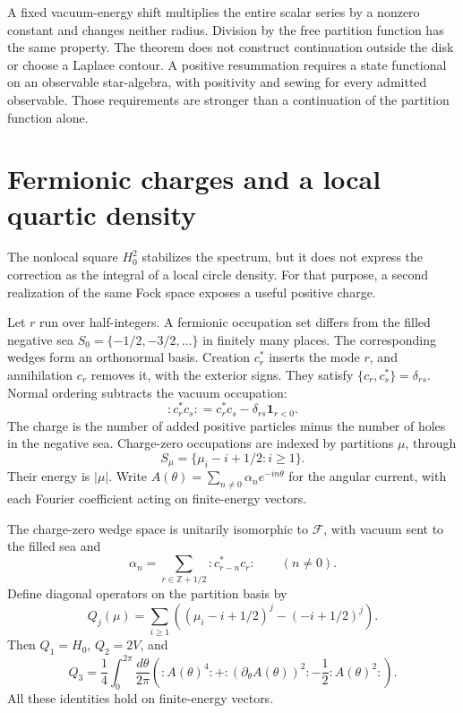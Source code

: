 A fixed vacuum-energy shift multiplies the entire scalar series by
a nonzero constant and changes neither radius. Division by the
free partition function has the same property. The theorem does not
construct continuation outside the disk or choose a Laplace contour.
A positive resummation requires a state functional on an observable
star-algebra, with positivity and sewing for every admitted observable.
Those requirements are stronger than a continuation of the partition
function alone.

\section{Fermionic charges and a local quartic density}

The nonlocal square \(H_0^2\) stabilizes the spectrum, but it does
not express the correction as the integral of a local circle density.
For that purpose, a second realization of the same Fock space exposes
a useful positive charge.

Let \(r\) run over half-integers. A fermionic occupation set differs
from the filled negative sea
\(S_0=\{-1/2,-3/2,\ldots\}\) in finitely many places.
The corresponding wedges form an orthonormal basis. Creation
\(c_r^*\) inserts the mode \(r\), and annihilation \(c_r\)
removes it, with the exterior signs. They satisfy
\(\{c_r,c_s^*\}=\delta_{rs}\).
Normal ordering subtracts the vacuum occupation:
\[
 {:}c_r^*c_s{:}=c_r^*c_s-\delta_{rs}\mathbf1_{r<0}.
\]
The charge is the number of added positive particles minus the
number of holes in the negative sea. Charge-zero occupations are
indexed by partitions \(\mu\), through
\[
 S_\mu=\{\mu_i-i+1/2:i\geq1\}.
\]
Their energy is \(|\mu|\). Write
\(A(\theta)=\sum_{n\ne0}\alpha_n e^{-in\theta}\) for the angular
current, with each Fourier coefficient acting on finite-energy vectors.

\begin{proposition}\label{prop:vol2-boson-fermion-charge}
The charge-zero wedge space is unitarily isomorphic to \(\mathcal F\),
with vacuum sent to the filled sea and
\begin{equation}\label{eq:vol2-fermion-current}
 \alpha_n=\sum_{r\in\mathbb Z+1/2}{:}c_{r-n}^*c_r{:}
 \qquad(n\ne0).
\end{equation}
Define diagonal operators on the partition basis by
\begin{equation}\label{eq:vol2-partition-charges}
 Q_j(\mu)=\sum_{i\geq1}
 \left((\mu_i-i+1/2)^j-(-i+1/2)^j\right).
\end{equation}
Then \(Q_1=H_0\), \(Q_2=2V\), and
\begin{equation}\label{eq:vol2-local-quartic-charge}
 Q_3=\frac14\int_0^{2\pi}\frac{d\theta}{2\pi}
 \left({:}A(\theta)^4{:}
       +{:}(\partial_\theta A(\theta))^2{:}
       -\frac12{:}A(\theta)^2{:}\right).
\end{equation}
All these identities hold on finite-energy vectors.
\end{proposition}

